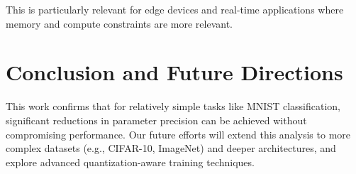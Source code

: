 \documentclass[11pt]{article}
\begin{document}
This is particularly relevant for edge devices and real-time applications where
memory and compute constraints are more relevant.

\section{Conclusion and Future Directions}

This work confirms that for relatively simple tasks like MNIST classification,
significant reductions in parameter precision can be achieved without
compromising performance. Our future efforts will extend this analysis to more
complex datasets (e.g., CIFAR-10, ImageNet) and deeper architectures, and
explore advanced quantization-aware training techniques.

\newpage
\printbibliography%
\end{document}

